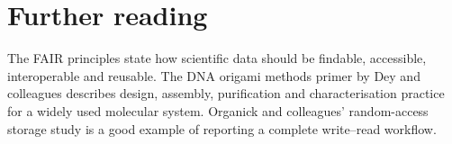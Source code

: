 \section*{Further reading}
The FAIR principles state how scientific data should be findable, accessible,
interoperable and reusable.\cite{Wilkinson2016} The DNA origami methods primer by
Dey and colleagues describes design, assembly, purification and characterisation
practice for a widely used molecular system.\cite{Dey2021} Organick and
colleagues' random-access storage study is a good example of reporting a
complete write--read workflow.\cite{Organick2018}
